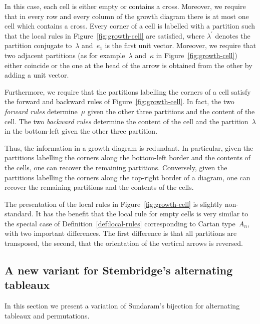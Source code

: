 \documentclass[10pt]{article}
\theoremstyle{definition}
\newcommand{\Dfn}[1]{\emph{\color{blue}#1}}
\begin{document}
In this case, each cell is either empty or contains a cross.
Moreover, we require that in every row and every column of the growth
diagram there is at most one cell which contains a cross. Every
corner of a cell is labelled with a partition such that the local
rules in Figure~\ref{fig:growth-cell} are satisfied, where
$\lambda^\prime$ denotes the partition conjugate to~$\lambda$
and~$e_1$ is the first unit vector. Moreover, we require that two
adjacent partitions (as for example~$\lambda$ and~$\kappa$ in
Figure~\ref{fig:growth-cell}) either coincide or the one at the head
of the arrow is obtained from the other by adding a unit vector.

Furthermore, we require that the partitions labelling the corners of
a cell satisfy the forward and backward rules of
Figure~\ref{fig:growth-cell}. In fact, the two \Dfn{forward rules}
determine~$\mu$ given the other three partitions and the content of
the cell. The two \Dfn{backward rules} determine the content of the
cell and the partition~$\lambda$ in the bottom-left given the other
three partition.

Thus, the information in a growth diagram is redundant. In
particular, given the partitions labelling the corners along the
bottom-left border and the contents of the cells, one can recover the
remaining partitions. Conversely, given the partitions labelling the
corners along the top-right border of a diagram, one can recover the
remaining partitions and the contents of the cells.

The presentation of the local rules in Figure~\ref{fig:growth-cell}
is slightly non-standard. It has the benefit that the local rule for
empty cells is very similar to the special case of
Definition~\ref{def:local-rules} corresponding to Cartan type~$A_n$,
with two important differences. The first difference is that all
partitions are transposed, the second, that the orientation of the
vertical arrows is reversed.

\setcounter{section}{5}\setcounter{subsection}{1}\setcounter{theorem}{2}
\subsection{A new variant for Stembridge's alternating tableaux}
\label{sec:Stembridge}

In this section we present a variation of Sundaram's bijection for
alternating tableaux and permutations.
\end{document}
